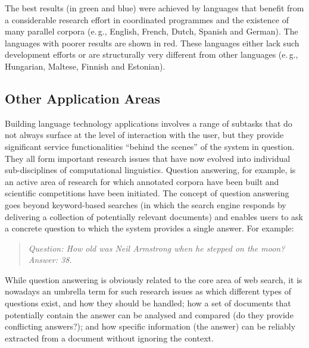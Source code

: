 \documentclass[]{../metanetpaper}
\begin{document}
\begin{multicols}{2}
The best results (in green and blue) were achieved by languages that benefit from a considerable research effort in coordinated programmes and the existence of many parallel corpora (e.\,g., English, French, Dutch, Spanish and German). The languages with poorer results are shown in red. These languages either lack such development efforts or are structurally very different from other languages (e.\,g., Hungarian, Maltese, Finnish and Estonian).

\subsection{Other Application Areas}

Building language technology applications involves a range of subtasks
that do not always surface at the level of interaction with the user,
but they provide significant service functionalities ``behind the
scenes'' of the system in question. They all form important research
issues that have now evolved into individual sub-disciplines of
computational linguistics.  Question answering, for example, is an
active area of research for which annotated corpora have been built
and scientific competitions have been initiated. The concept of
question answering goes beyond keyword-based searches (in which the
search engine responds by delivering a collection of potentially
relevant documents) and enables users to ask a concrete question to
which the system provides a single answer. For example: 

\begin{quote}
\textit{Question: How old was Neil Armstrong when he stepped on the moon?}\\
\textit{Answer: 38.}
\end{quote}

While question answering is obviously related to the core area of web search, it is nowadays an umbrella term for such research issues as which different types of questions exist, and how they should be handled; how a set of documents that potentially contain the answer can be analysed and compared (do they provide conflicting answers?); and how specific information (the answer) can be reliably extracted from a document without ignoring the context. 



\end{multicols}
\end{document}
